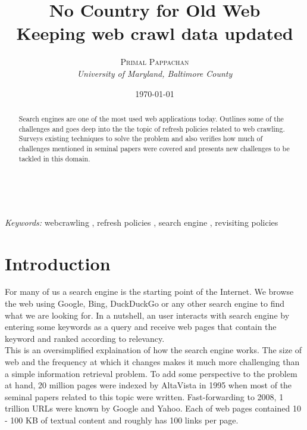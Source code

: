 \documentclass[a4paper, 11pt]{article} %
\title{\textbf{No Country for Old Web}\\ %
Keeping web crawl data updated} %
\author{\textsc{Primal Pappachan} %
\\{\textit{University of Maryland, Baltimore County}}} %
\date{\today} %
\makeatletter
\renewcommand{\maketitle}{ %
\begin{flushright} %
{\LARGE\@title} %

\vspace{50pt} %

{\large\@author} %
\\\@date %

\vspace{40pt} %
\end{flushright}
}
\makeatother
\begin{document}
\maketitle %



\begin{abstract}

Search engines are one of the most used web applications today. Outlines some of the challenges and goes deep into the the topic of refresh policies related to web crawling. Surveys existing techniques to solve the problem and also verifies how much of challenges mentioned in seminal papers were covered and presents new challenges to be tackled in this domain.

\end{abstract}

\hspace*{3,6mm}\textit{Keywords:} webcrawling , refresh policies , search engine , revisiting policies %

\vspace{30pt} %


\section*{Introduction}

For many of us a search engine is the starting point of the Internet. We browse the web using Google, Bing, DuckDuckGo or any other search engine to find what we are looking for. In a nutshell, an user interacts with search engine by entering some keywords as a query and receive web pages that contain the keyword and ranked according to relevancy. \\

This is an oversimplified explaination of how the search engine works. The size of web and the frequency at which it changes makes it much more challenging than a simple information retrieval problem. To add some perspective to the problem at hand, 20 million pages were indexed by AltaVista in 1995 when most of the seminal papers related to this topic were written. Fast-forwarding to 2008, 1 trillion URLs were known by Google and Yahoo. Each of web pages contained 10 - 100 KB of textual content and roughly has 100 links per page. \cite{stats2008st} \\ 
\end{document}
